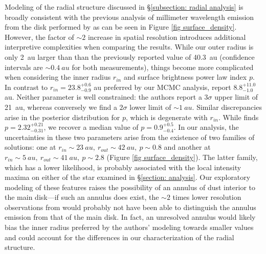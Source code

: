 \documentclass[modern]{aastex62}
\begin{document}
Modeling of the radial structure discussed in \S \ref{subsection: radial analysis} is broadly consistent with the previous analysis of millimeter wavelength emission from the disk performed by \cite{macgregor13} as can be seen in Figure \ref{fig surface_density}. 
However, the factor of $\sim 2$ increase in spatial resolution introduces additional interpretive complexities when comparing the results.
While our outer radius is only \SI{2}{au} larger than than the previously reported value of \SI{40.3}{au} (confidence intervals are $\sim \SI{0.4}{au}$ for both measurements), things become more complicated when considering the inner radius $r_{in}$ and surface brightness power law index $p$.
In contrast to $r_{in} = 23.8_{-0.9}^{ +0.6}$ \si{au} preferred by our MCMC analysis, \cite{macgregor13} report $8.8_{-1.0} ^{+11.0}$ \si{au}.
Neither parameter is well constrained: the authors report a $3 \sigma$ upper limit of \SI{21}{au}, whereas conversely we find a $2 \sigma$ lower limit of $\sim \SI{1}{au}$.
Similar discrepancies arise in the posterior distribution for $p$, which is degenerate with $r_{in}$.
While \cite{macgregor13} finds $p=2.32_{-0.31}^{+0.21}$, we recover a median value of $p=0.9_{-0.4}^{+0.5}$.
In our analysis, the uncertainties in these two parameters arise from the existence of two families of solutions: one at $r_{in} \sim \SI{23}{au},\ r_{out} \sim \SI{42}{au},\ p \sim 0.8$ and another at $r_{in} \sim \SI{5}{au},\ r_{out} \sim \SI{41}{au},\ p \sim 2.8$ (Figure \ref{fig surface_density}).
The latter family, which has a lower likelihood, is probably associated with the local intensity maxima on either of the star examined in \S \ref{section: analysis}.
Our exploratory modeling of these features raises the possibility of an annulus of dust interior to the main disk---if such an annulus does exist, the $\sim 2$ times lower resolution observations from \cite{macgregor13} would probably not have been able to distinguish the annulus emission from that of the main disk.
In fact, an unresolved annulus would likely bias the inner radius preferred by the authors' modeling towards smaller values and could account for the differences in our characterization of the radial structure.
\end{document}
